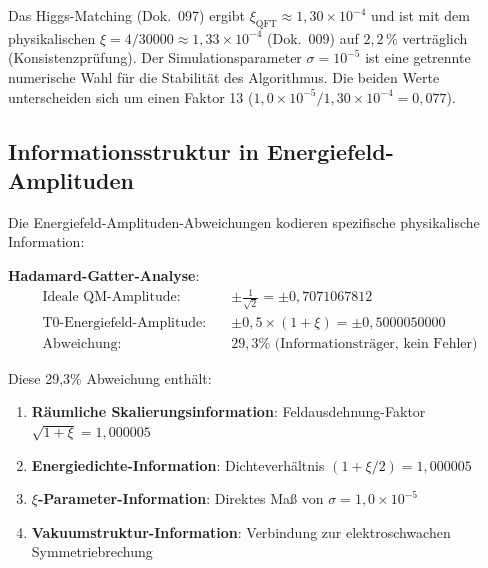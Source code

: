 	\begin{table}[htbp]
		\centering
		\caption{$\xi$-Parameter-Quellen-Vergleich}
	\end{table}
	
	Das Higgs-Matching (Dok.~097) ergibt $\xi_{\text{QFT}} \approx 1{,}30 \times 10^{-4}$ und ist mit dem physikalischen $\xi = 4/30000 \approx 1{,}33 \times 10^{-4}$ (Dok.~009) auf $2{,}2\,\%$ verträglich (Konsistenzprüfung). Der Simulationsparameter $\sigma = 10^{-5}$ ist eine getrennte numerische Wahl für die Stabilität des Algorithmus. Die beiden Werte unterscheiden sich um einen Faktor 13 ($1{,}0 \times 10^{-5}/1{,}30 \times 10^{-4} = 0{,}077$).
	
	\subsection{Informationsstruktur in Energiefeld-Amplituden}
	
	Die Energiefeld-Amplituden-Abweichungen kodieren spezifische physikalische Information:
	
	\textbf{Hadamard-Gatter-Analyse}:
	\begin{align}
		\text{Ideale QM-Amplitude:} \quad &\pm \frac{1}{\sqrt{2}} = \pm 0,7071067812 \\
		\text{T0-Energiefeld-Amplitude:} \quad &\pm 0,5 \times (1 + \xi) = \pm 0,5000050000 \\
		\text{Abweichung:} \quad &29,3\% \text{ (Informationsträger, kein Fehler)}
	\end{align}
	
	Diese 29,3\% Abweichung enthält:
	\begin{enumerate}
		\item \textbf{Räumliche Skalierungsinformation}: Feldausdehnung-Faktor $\sqrt{1+\xi} = 1,000005$
		\item \textbf{Energiedichte-Information}: Dichteverhältnis $(1+\xi/2) = 1,000005$
		\item \textbf{$\xi$-Parameter-Information}: Direktes Maß von $\sigma = 1,0 \times 10^{-5}$
		\item \textbf{Vakuumstruktur-Information}: Verbindung zur elektroschwachen Symmetriebrechung
	\end{enumerate}
	
